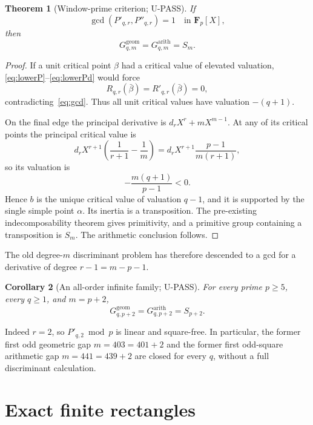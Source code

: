 \documentclass[11pt]{article}
\theoremstyle{keio}
\newtheorem{theorem}{Theorem}[section]
\newtheorem{corollary}[theorem]{Corollary}
\theoremstyle{keioinput}
\newcommand{\UPASS}{\textcolor{passgreen}{\textsf{U-PASS}}}
\newcommand{\F}{\mathbf{F}}
\begin{document}
\begin{theorem}[Window-prime criterion; \UPASS]\label{thm:window}
If
\begin{equation}
\gcd(P'_{q,r},P''_{q,r})=1
\quad\text{in }\F_p[X],
\label{eq:gcd}
\end{equation}
then
\begin{equation}
\boxed{G^{\mathrm{geom}}_{q,m}=G^{\mathrm{arith}}_{q,m}=S_m.}
\label{eq:window-mon}
\end{equation}
\end{theorem}

\begin{proof}
If a unit critical point $\beta$ had a critical value of elevated
valuation, \eqref{eq:lowerP}--\eqref{eq:lowerPd} would force
\[
R_{q,r}(\bar\beta)=R'_{q,r}(\bar\beta)=0,
\]
contradicting~\eqref{eq:gcd}. Thus all unit critical values have valuation
$-(q+1)$.

On the final edge the principal derivative is
$d_rX^r+mX^{m-1}$. At any of its critical points the principal critical
value is
\[
d_rX^{r+1}
\left(\frac1{r+1}-\frac1m\right)
=d_rX^{r+1}\frac{p-1}{m(r+1)},
\]
so its valuation is
\[
-\frac{m(q+1)}{p-1}<0.
\]
Hence $b$ is the unique critical value of valuation $q-1$, and it is
supported by the single simple point $\alpha$. Its inertia is a
transposition. The pre-existing indecomposability theorem gives primitivity,
and a primitive group containing a transposition is $S_m$. The arithmetic
conclusion follows.
\end{proof}

The old degree-$m$ discriminant problem has therefore descended to a gcd for
a derivative of degree $r-1=m-p-1$.

\begin{corollary}[An all-order infinite family; \UPASS]\label{cor:shifted}
For every prime $p\ge5$, every $q\ge1$, and $m=p+2$,
\begin{equation}
\boxed{G^{\mathrm{geom}}_{q,p+2}=G^{\mathrm{arith}}_{q,p+2}=S_{p+2}.}
\label{eq:shifted}
\end{equation}
\end{corollary}

Indeed $r=2$, so $P'_{q,2}\bmod p$ is linear and square-free. In
particular, the former first odd geometric gap $m=403=401+2$ and the former
first odd-square arithmetic gap $m=441=439+2$ are closed for every $q$,
without a full discriminant calculation.

\section{Exact finite rectangles}
\end{document}
